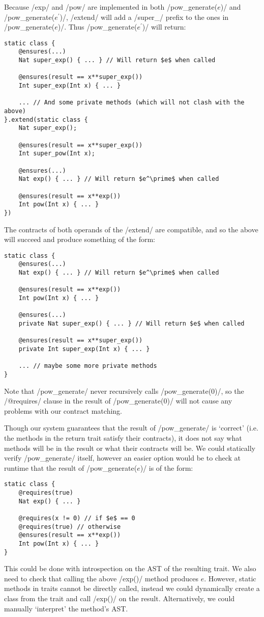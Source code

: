 Because /exp/ and /pow/ are implemented in both /pow_generate($e$)/ and /pow_generate($e^\prime$)/, /extend/ will add a /super_/ prefix to the ones in /pow_generate($e$)/. Thus /pow_generate($e^\prime$)/ will return:
\begin{lstlisting}
static class {
	@ensures(...)
	Nat super_exp() { ... } // Will return $e$ when called

	@ensures(result == x**super_exp())
	Int super_exp(Int x) { ... }
	
	... // And some private methods (which will not clash with the above)
}.extend(static class {
	Nat super_exp();

	@ensures(result == x**super_exp())
	Int super_pow(Int x);
	
	@ensures(...)
	Nat exp() { ... } // Will return $e^\prime$ when called

	@ensures(result == x**exp())
	Int pow(Int x) { ... }
})
\end{lstlisting}

The contracts of both operands of the /extend/ are compatible, and so the above will succeed and produce something of the form:
\begin{lstlisting}
static class {
	@ensures(...)
	Nat exp() { ... } // Will return $e^\prime$ when called

	@ensures(result == x**exp())
	Int pow(Int x) { ... }

	@ensures(...)
	private Nat super_exp() { ... } // Will return $e$ when called

	@ensures(result == x**super_exp())
	private Int super_exp(Int x) { ... }
	
	... // maybe some more private methods
}
\end{lstlisting}

Note that /pow_generate/ never recursively calls /pow_generate(0)/, so the /@requires/ clause in the result of /pow_generate(0)/ will not cause any problems with our contract matching.

Though our system guarantees that the result of /pow_generate/ is `correct' (i.e. the methods in the return trait satisfy their contracts), it does not say what methods will be in the result or what their contracts will be. We could statically verify /pow_generate/ itself, however an easier option would be to check at runtime that the result of /pow_generate($e$)/ is of the form:
\begin{lstlisting}
static class {
	@requires(true)
	Nat exp() { ... }

	@requires(x != 0) // if $e$ == 0
	@requires(true) // otherwise
	@ensures(result == x**exp())
	Int pow(Int x) { ... }
}
\end{lstlisting}
This could be done with introspection on the AST of the resulting trait. We also need to check that calling the above /exp()/ method produces $e$. However, static methods in traits cannot be directly called, instead we could dynamically create a class from the trait and call /exp()/ on the result. Alternatively, we could manually `interpret' the method's AST.